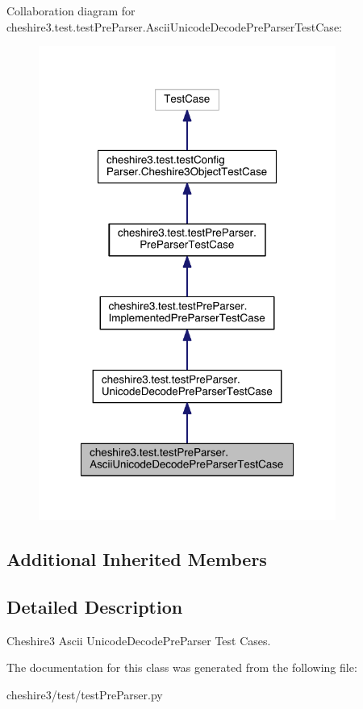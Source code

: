Collaboration diagram for cheshire3.\-test.\-test\-Pre\-Parser.\-Ascii\-Unicode\-Decode\-Pre\-Parser\-Test\-Case\-:
\nopagebreak
\begin{figure}[H]
\begin{center}
\leavevmode
\includegraphics[width=276pt]{classcheshire3_1_1test_1_1test_pre_parser_1_1_ascii_unicode_decode_pre_parser_test_case__coll__graph}
\end{center}
\end{figure}
\subsection*{Additional Inherited Members}


\subsection{Detailed Description}
\begin{DoxyVerb}Cheshire3 Ascii UnicodeDecodePreParser Test Cases.\end{DoxyVerb}
 

The documentation for this class was generated from the following file\-:\begin{DoxyCompactItemize}
\item 
cheshire3/test/test\-Pre\-Parser.\-py\end{DoxyCompactItemize}

